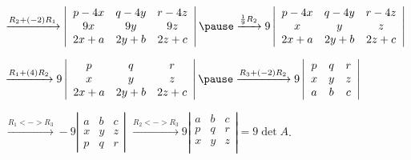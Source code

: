 \documentclass[pdf
,handout
]{beamer}
\begin{document}
{{\begin{solution}
$ 
\xrightarrow{R_2 + (-2)R_1}
 \left|\begin{array}{ccc}
p-4x & q-4y & r-4z \\
9x & 9y & 9z \\
2x+a & 2y+b & 2z+c
\end{array}\right|
\pause
\xrightarrow{\frac{1}{9}R_2}
 9\left|\begin{array}{ccc}
p-4x & q-4y & r-4z \\
x & y & z \\
2x+a & 2y+b & 2z+c
\end{array}\right|$
\medskip
\pause

$
\xrightarrow{R_1 + (4)R_2}
9\left|\begin{array}{ccc}
p & q & r \\
x & y & z \\
2x+a & 2y+b & 2z+c
\end{array}\right|
\pause
\xrightarrow{R_3 + (-2)R_2}
 9\left|\begin{array}{ccc}
p & q & r \\
x & y & z \\
a & b & c
\end{array}\right|$
\medskip
\pause

$\xrightarrow{R_1 <-> R_3}
-9\left|\begin{array}{ccc}
a & b & c\\
x & y & z \\
p & q & r 
\end{array}\right|$
\medskip
\pause
$ \xrightarrow{R_2 <-> R_3}
 9\left|\begin{array}{ccc}
a & b & c\\
p & q & r \\
x & y & z \\
\end{array}\right|
=9\det A$.
\end{solution}
}

}
\end{document}
